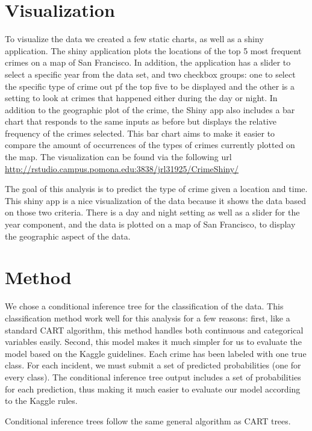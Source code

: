 \documentclass[11pt]{article}
\begin{document}
\section*{Visualization}

To visualize the data we created a few static charts, as well as a shiny application. The shiny application plots the locations of the top 5 most frequent crimes on a map of San Francisco. In addition, the application has a slider to select a specific year from the data set, and two checkbox groups: one to select the specific type of crime out pf the top five to be displayed and the other is a setting to look at crimes that happened either during the day or night. In addition to the geographic plot of the crime, the Shiny app also includes a bar chart that responds to the same inputs as before but displays the relative frequency of the crimes selected. This bar chart aims to make it easier to compare the amount of occurrences of the types of crimes currently plotted on the map. The visualization can be found via the following url \url{http://rstudio.campus.pomona.edu:3838/jrl31925/CrimeShiny/}
 

The goal of this analysis is to predict the type of crime given a location and time. This shiny app is a nice visualization of the data because it shows the data based on those two criteria. There is a day and night setting as well as a slider for the year component, and the data is plotted on a map of San Francisco, to display the geographic aspect of the data. 



\section*{Method}

We chose a conditional inference tree for the classification of the data.  This classification method work well for this analysis for a few reasons: first, like a standard CART algorithm, this method handles both continuous and categorical variables easily. Second, this model makes it much simpler for us to evaluate the model based on the Kaggle guidelines. Each crime has been labeled with one true class. For each incident, we must submit a set of predicted probabilities (one for every class). The conditional inference tree output includes a set of probabilities for each prediction, thus making it much easier to evaluate our model according to the Kaggle rules. 
 
Conditional inference trees follow the same general algorithm as CART trees. 
\end{document}
